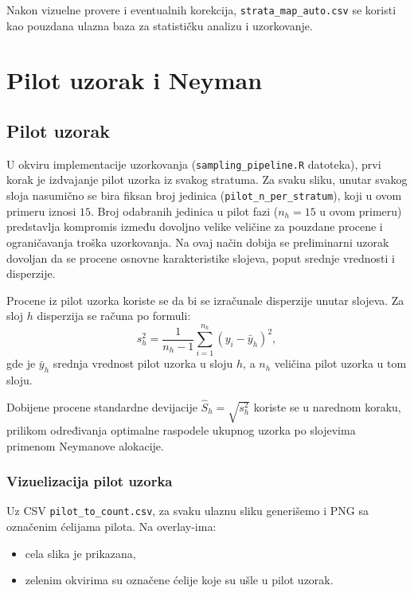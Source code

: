 \documentclass[a4paper,12pt]{article}
\begin{document}
\noindent
Nakon vizuelne provere i eventualnih korekcija, \texttt{strata\_map\_auto.csv} se koristi kao pouzdana ulazna baza za statističku analizu i uzorkovanje.

\section{Pilot uzorak i Neyman}

\subsection{Pilot uzorak}

U okviru implementacije uzorkovanja (\texttt{sampling\_pipeline.R} datoteka), 
prvi korak je izdvajanje pilot uzorka iz svakog stratuma. 
Za svaku sliku, unutar svakog sloja nasumično se bira fiksan broj jedinica 
(\texttt{pilot\_n\_per\_stratum}), koji u ovom primeru iznosi $15$. Broj odabranih jedinica u pilot fazi ($n_h = 15$ u ovom primeru) predstavlja kompromis između 
dovoljno velike veličine za pouzdane procene i ograničavanja troška uzorkovanja.
Na ovaj način dobija se preliminarni uzorak dovoljan da se procene osnovne 
karakteristike slojeva, poput srednje vrednosti i disperzije.

Procene iz pilot uzorka koriste se da bi se izračunale disperzije unutar slojeva. 
Za sloj $h$ disperzija se računa po formuli:
\[
s_h^2 = \frac{1}{n_h - 1} \sum_{i=1}^{n_h} (y_i - \bar{y}_h)^2,
\]
gde je $\bar{y}_h$ srednja vrednost pilot uzorka u sloju $h$, a $n_h$ veličina pilot uzorka u tom sloju.

Dobijene procene standardne devijacije $\hat{S}_h = \sqrt{s_h^2}$ 
koriste se u narednom koraku, prilikom određivanja optimalne raspodele ukupnog 
uzorka po slojevima primenom Neymanove alokacije.
\subsubsection{Vizuelizacija pilot uzorka}

Uz CSV \texttt{pilot\_to\_count.csv}, za svaku ulaznu sliku generišemo i PNG sa označenim ćelijama pilota. Na overlay-ima:
\begin{itemize}
	\item cela slika je prikazana,
	\item zelenim okvirima su označene ćelije koje su ušle u pilot uzorak.
\end{itemize}
\end{document}
